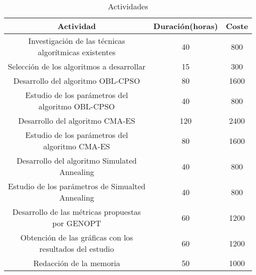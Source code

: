 \begin{table}[h]
    \begin{tabular}{|c|c|c|}
    \hline
    Actividad                                                & Duración(horas) & Coste    \\ \hline
    Investigación de las técnicas algorítmicas existentes    & 40              & 800      \\ \hline
    Selección de los algoritmos a desarrollar                & 15               & 300      \\ \hline
    Desarrollo del algoritmo OBL-CPSO                        & 80              & 1600      \\ \hline
    Estudio de los parámetros del algoritmo OBL-CPSO         & 40              & 800      \\ \hline
    Desarrollo del algoritmo CMA-ES                          & 120              & 2400     \\ \hline
    Estudio de los parámetros del algoritmo CMA-ES           & 80              & 1600      \\ \hline
    Desarrollo del algoritmo Simulated Annealing             & 40              & 800      \\ \hline
    Estudio de los parámetros de Simualted Annealing         & 40              & 800      \\ \hline
    Desarrollo de las métricas propuestas por GENOPT         & 60              & 1200      \\ \hline
    Obtención de las gráficas con los resultados del estudio & 60              & 1200      \\ \hline
    Redacción de la memoria                                  & 50              & 1000      \\ \hline
    \end{tabular}
    \caption {Actividades}
\end{table}
